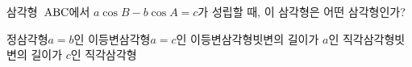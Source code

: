 삼각형~$\mathrm{ABC}$에서 $a\cos B-b\cos A=c$가 성립할 때, 이 삼각형은 어떤 삼각형인가?
\begin{choicesv}{정삼각형}{$a=b$인 이등변삼각형}{$a=c$인 이등변삼각형}{빗변의 길이가 $a$인 직각삼각형}{빗변의 길이가 $c$인 직각삼각형}\end{choicesv}
